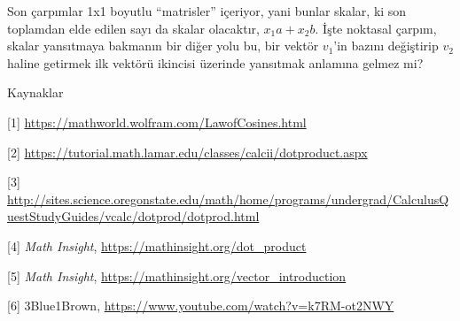 \documentclass[12pt,fleqn]{article}\usepackage{../../common}
\begin{document}
Son çarpımlar 1x1 boyutlu ``matrisler'' içeriyor, yani bunlar skalar, ki son
toplamdan elde edilen sayı da skalar olacaktır, $x_1 a + x_2 b$. İşte noktasal
çarpım, skalar yansıtmaya bakmanın bir diğer yolu bu, bir vektör $v_1$'in bazını
değiştirip $v_2$ haline getirmek ilk vektörü ikincisi üzerinde yansıtmak
anlamına gelmez mi? 

Kaynaklar

[1] \url{https://mathworld.wolfram.com/LawofCosines.html}

[2] \url{https://tutorial.math.lamar.edu/classes/calcii/dotproduct.aspx}

[3] \url{http://sites.science.oregonstate.edu/math/home/programs/undergrad/CalculusQuestStudyGuides/vcalc/dotprod/dotprod.html}

[4] {\em Math Insight},
    \url{https://mathinsight.org/dot_product}

[5] {\em Math Insight},
    \url{https://mathinsight.org/vector_introduction}

[6] 3Blue1Brown, \url{https://www.youtube.com/watch?v=k7RM-ot2NWY}
\end{document}
